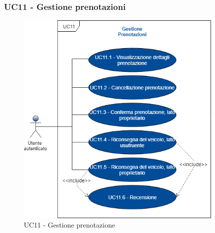 \subsubsection{UC11 - Gestione prenotazioni}
\begin{figure}[h]
	\includegraphics[width=10cm]{res/images/UC11Prenotazione.png}
	\centering
	\caption{UC11 - Gestione prenotazione}
\end{figure}
